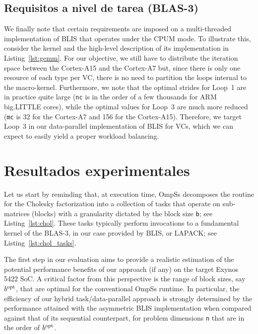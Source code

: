 
\subsection{Requisitos a nivel de tarea (BLAS-3)}

We finally note that certain requirements are imposed on a multi-threaded implementation of BLIS that operates under the 
CPUM mode. 
To illustrate this, consider the \gemm kernel and the high-level description of its implementation
in Listing~\ref{lst:gemm}. For our objective,
we still have to distribute the iteration space between the Cortex-A15 and the Cortex-A7 but, since there is only one resource of each type per VC,
there is no need to partition the loops internal to the macro-kernel. 
Furthermore, we note that the optimal strides for Loop~1 are in practice quite
large ({\tt nc} is in the order of a few thousands for ARM big.LITTLE cores), while the optimal values for Loop~3 are much more reduced
({\tt mc} is 32 for the Cortex-A7 and 156 for the Cortex-A15). Therefore, we target Loop~3 in our data-parallel implementation of BLIS for
VCs, which we can expect to easily yield a proper workload balancing.


\section{Resultados experimentales}

Let us start by reminding that, at execution time, OmpSs decomposes the routine for the Cholesky factorization into a collection of tasks 
that operate on sub-matrices (blocks) with a granularity 
dictated by the block size {\tt b}; see Listing~\ref{lst:chol}. 
These tasks typically perform invocations to a fundamental kernel of the BLAS-3, 
in our case provided by BLIS, or LAPACK; see Listing~\ref{lst:chol_tasks}.  

\newcommand{\bopt}{b^{\mbox{\rm \scriptsize opt}}\xspace}

The first step in our evaluation aims to provide a realistic estimation of the potential performance benefits
of our approach (if any) on the target Exynos 5422 SoC. 
A critical factor from this perspective is the range of block sizes, say $\bopt$,
that are optimal for the conventional OmpSs runtime. In particular, the efficiency 
of our hybrid task/data-parallel approach is strongly determined by the performance 
attained with the asymmetric BLIS implementation when compared against that of its sequential counterpart,
for problem dimensions {\tt n} that are in the order of $\bopt$.

